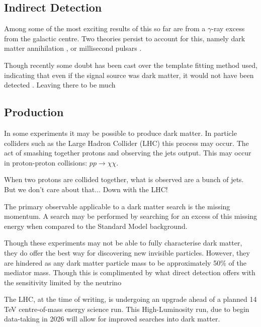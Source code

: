 \subsection{Indirect Detection}

\par
Among some of the most exciting results of this so far are from a $\gamma$-ray excess from the galactic centre.
Two theories persist to account for this, namely dark matter annihilation \cite{galactic_gamma_excess_1_ref, galactic_gamma_excess_2_ref}, or millisecond pulsars \cite{galactic_gamma_excess_3_ref, galactic_gamma_excess_4_ref}.

\par
Though recently some doubt has been cast over the template fitting method used, indicating that even if the signal source was dark matter, it would not have been detected \cite{galactic_gamma_excess_5_ref}.
Leaving there to be much 


\subsection{Production}
\par
In some experiments it may be possible to produce dark matter.
In particle colliders such as the Large Hadron Collider (LHC) this process may occur.
The act of smashing together protons and observing the jets output.
This may occur in proton-proton collisions: $pp\xrightarrow{}\chi\chi$.

\par
When two protons are collided together, what is observed are a bunch of jets. 
But we don't care about that... Down with the LHC!

\par
The primary observable applicable to a dark matter search is the missing momentum.
A search may be performed by searching for an excess of this missing energy when compared to the Standard Model background.





\par
Though these experiments may not be able to fully characterise dark matter, they do offer the best way for discovering new invisible particles.
However, they are hindered as any dark matter particle mass to be approximately 50\% of the mediator mass.
Though this is complimented by what direct detection offers with the sensitivity limited by the neutrino
\par
The LHC, at the time of writing, is undergoing an upgrade ahead of a planned 14 TeV centre-of-mass energy science run. 
This High-Luminosity run, due to begin data-taking in 2026 will allow for improved searches into dark matter.

